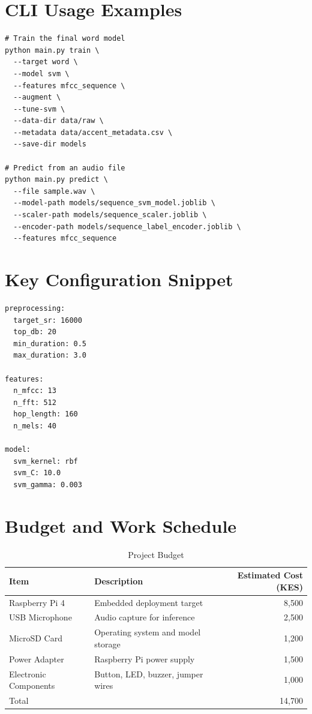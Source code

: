 \documentclass[12pt,a4paper]{report}
\begin{document}
\appendix

\chapter{CLI Usage Examples}
\begin{verbatim}
# Train the final word model
python main.py train \
  --target word \
  --model svm \
  --features mfcc_sequence \
  --augment \
  --tune-svm \
  --data-dir data/raw \
  --metadata data/accent_metadata.csv \
  --save-dir models

# Predict from an audio file
python main.py predict \
  --file sample.wav \
  --model-path models/sequence_svm_model.joblib \
  --scaler-path models/sequence_scaler.joblib \
  --encoder-path models/sequence_label_encoder.joblib \
  --features mfcc_sequence
\end{verbatim}

\chapter{Key Configuration Snippet}
\begin{verbatim}
preprocessing:
  target_sr: 16000
  top_db: 20
  min_duration: 0.5
  max_duration: 3.0

features:
  n_mfcc: 13
  n_fft: 512
  hop_length: 160
  n_mels: 40

model:
  svm_kernel: rbf
  svm_C: 10.0
  svm_gamma: 0.003
\end{verbatim}

\chapter{Budget and Work Schedule}
\begin{table}[H]
\centering
\caption{Project Budget}
\begin{tabular}{p{5cm}p{6cm}r}
\toprule
\textbf{Item} & \textbf{Description} & \textbf{Estimated Cost (KES)}\\
\midrule
Raspberry Pi 4 & Embedded deployment target & 8,500\\
USB Microphone & Audio capture for inference & 2,500\\
MicroSD Card & Operating system and model storage & 1,200\\
Power Adapter & Raspberry Pi power supply & 1,500\\
Electronic Components & Button, LED, buzzer, jumper wires & 1,000\\
\midrule
Total & & 14,700\\
\bottomrule
\end{tabular}
\end{table}
\end{document}
